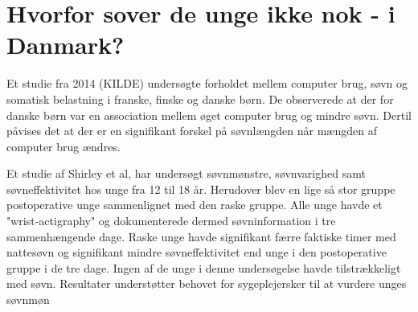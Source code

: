 \section{Hvorfor sover de unge ikke nok - i Danmark?}
\label{sec:hvorforSoverDeUngeIkkeNok}

Et studie fra 2014 (KILDE) undersøgte forholdet mellem computer brug, søvn og somatisk belastning i franske, finske og danske børn. De observerede at der for danske børn var en association mellem øget computer brug og mindre søvn. Dertil påvises det at der er en signifikant forskel på søvnlængden når mængden af computer brug ændres.


Et studie af Shirley et al, har undersøgt søvnmønstre, søvnvarighed samt søvneffektivitet hos unge fra 12 til 18 år. Herudover blev en lige så stor gruppe postoperative unge sammenlignet med den raske gruppe.  
Alle unge havde et "wrist-actigraphy" og dokumenterede dermed søvninformation i tre sammenhængende dage. 
Raske unge havde signifikant færre faktiske timer med nattesøvn og signifikant mindre søvneffektivitet end unge i den postoperative gruppe i de tre dage. Ingen af de unge i denne undersøgelse havde tilstrækkeligt med søvn. 
Resultater understøtter behovet for sygeplejersker til at vurdere unges søvnmøn



